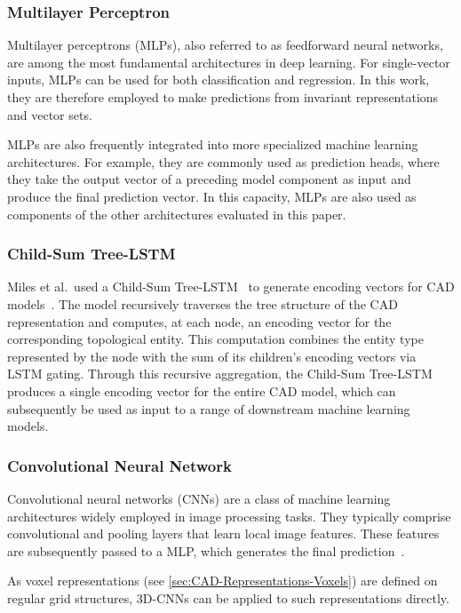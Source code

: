 \documentclass[5p,times,procedia]{elsarticle}
\begin{document}
\subsubsection{Multilayer Perceptron}\label{sec:ML-Architectures-MLP}
Multilayer perceptrons (MLPs), also referred to as feedforward neural networks, are among the most fundamental architectures in deep learning.
For single-vector inputs, MLPs can be used for both classification and regression.
In this work, they are therefore employed to make predictions from invariant representations and vector sets. 

MLPs are also frequently integrated into more specialized machine learning architectures.
For example, they are commonly used as prediction heads, where they take the output vector of a preceding model component as input and produce the final prediction vector.
In this capacity, MLPs are also used as components of the other architectures evaluated in this paper. 

\subsubsection{Child-Sum Tree-LSTM}\label{sec:ML-Architectures-TreeLSTM}
Miles et al.\ used a Child-Sum Tree-LSTM~\cite{tai2015improved} to generate encoding vectors for CAD models~\cite{miles2023recursive}.
The model recursively traverses the tree structure of the CAD representation and computes, at each node, an encoding vector for the corresponding topological entity.
This computation combines the entity type represented by the node with the sum of its children's encoding vectors via LSTM gating.
Through this recursive aggregation, the Child-Sum Tree-LSTM produces a single encoding vector for the entire CAD model, which can subsequently be used as input to a range of downstream machine learning models.

\subsubsection{Convolutional Neural Network}\label{sec:ML-Architectures-CNN}
Convolutional neural networks (CNNs) are a class of machine learning architectures widely employed in image processing tasks.
They typically comprise convolutional and pooling layers that learn local image features.
These features are subsequently passed to a MLP, which generates the final prediction~\cite{james2013introduction}.

As voxel representations (see \cref{sec:CAD-Representations-Voxels}) are defined on regular grid structures, \mbox{3D-CNNs} can be applied to such representations directly.
\end{document}
